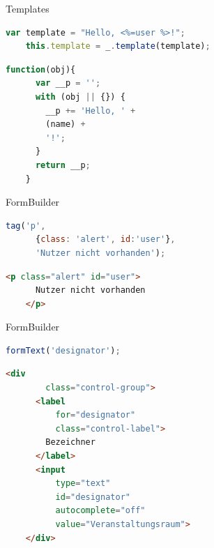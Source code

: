 
\begin{Frame}[fragile]{Templates}
  \begin{lstlisting}[language=JavaScript,gobble=4]
    var template = "Hello, <%=user %>!";
    this.template = _.template(template);
  \end{lstlisting}
  
  \begin{lstlisting}[language=JavaScript,gobble=4]
    function(obj){
      var __p = '';
      with (obj || {}) {
        __p += 'Hello, ' +
        (name) +
        '!';
      }
      return __p;
    }
  \end{lstlisting}
\end{Frame}

\begin{Frame}[fragile]{FormBuilder}
  \begin{lstlisting}[language=JavaScript,gobble=4]
    tag('p',
      {class: 'alert', id:'user'},
      'Nutzer nicht vorhanden');
  \end{lstlisting}
  \begin{lstlisting}[language=HTML,gobble=4]
    <p class="alert" id="user">
      Nutzer nicht vorhanden
    </p>
  \end{lstlisting}
\end{Frame}

\begin{frame}[fragile]{FormBuilder}
  \begin{lstlisting}[language=JavaScript,gobble=4]
    formText('designator');
  \end{lstlisting}
  \begin{lstlisting}[language=HTML,gobble=4]
    <div
        class="control-group">
      <label
          for="designator"
          class="control-label">
        Bezeichner
      </label>
      <input
          type="text"
          id="designator"
          autocomplete="off"
          value="Veranstaltungsraum">
    </div>
  \end{lstlisting}
\end{frame}

